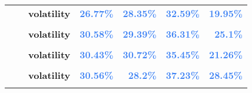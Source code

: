 \documentclass[
  authoryear,
  preprint,
  3p]{elsarticle}
\begin{document}
\begin{longtable}[t]{>{}l>{}l>{}l>{}r>{}r>{}r>{}r}
\textbf{} & \textbf{} & \textbf{volatility} & \textcolor[HTML]{4285f4}{\textbf{26.77\%}} & \textcolor[HTML]{4285f4}{\textbf{28.35\%}} & \textcolor[HTML]{4285f4}{\textbf{32.59\%}} & \textcolor[HTML]{4285f4}{\textbf{19.95\%}}\\
\textbf{\cellcolor{gray!10}{Lumber (XCME)}} & \textbf{\cellcolor{gray!10}{whole period}} & \textbf{\cellcolor{gray!10}{mean}} & \textcolor[HTML]{4285f4}{\textbf{\cellcolor{gray!10}{1.9\%}}} & \textcolor[HTML]{4285f4}{\textbf{\cellcolor{gray!10}{-3.58\%}}} & \textcolor[HTML]{4285f4}{\textbf{\cellcolor{gray!10}{11.74\%}}} & \textcolor[HTML]{4285f4}{\textbf{\cellcolor{gray!10}{5.06\%}}}\\
\textbf{} & \textbf{} & \textbf{volatility} & \textcolor[HTML]{4285f4}{\textbf{30.58\%}} & \textcolor[HTML]{4285f4}{\textbf{29.39\%}} & \textcolor[HTML]{4285f4}{\textbf{36.31\%}} & \textcolor[HTML]{4285f4}{\textbf{25.1\%}}\\
\textbf{\cellcolor{gray!10}{}} & \textbf{\cellcolor{gray!10}{backwardation}} & \textbf{\cellcolor{gray!10}{mean}} & \textcolor[HTML]{4285f4}{\textbf{\cellcolor{gray!10}{-8.48\%}}} & \textcolor[HTML]{4285f4}{\textbf{\cellcolor{gray!10}{-2.37\%}}} & \textcolor[HTML]{4285f4}{\textbf{\cellcolor{gray!10}{29.11\%}}} & \textcolor[HTML]{4285f4}{\textbf{\cellcolor{gray!10}{**26.99\%}}}\\
\addlinespace
\textbf{} & \textbf{} & \textbf{volatility} & \textcolor[HTML]{4285f4}{\textbf{30.43\%}} & \textcolor[HTML]{4285f4}{\textbf{30.72\%}} & \textcolor[HTML]{4285f4}{\textbf{35.45\%}} & \textcolor[HTML]{4285f4}{\textbf{21.26\%}}\\
\textbf{\cellcolor{gray!10}{}} & \textbf{\cellcolor{gray!10}{contango}} & \textbf{\cellcolor{gray!10}{mean}} & \textcolor[HTML]{4285f4}{\textbf{\cellcolor{gray!10}{11.68\%}}} & \textcolor[HTML]{4285f4}{\textbf{\cellcolor{gray!10}{-4.77\%}}} & \textcolor[HTML]{4285f4}{\textbf{\cellcolor{gray!10}{-5.04\%}}} & \textcolor[HTML]{4285f4}{\textbf{\cellcolor{gray!10}{-17.14\%}}}\\
\textbf{} & \textbf{} & \textbf{volatility} & \textcolor[HTML]{4285f4}{\textbf{30.56\%}} & \textcolor[HTML]{4285f4}{\textbf{28.2\%}} & \textcolor[HTML]{4285f4}{\textbf{37.23\%}} & \textcolor[HTML]{4285f4}{\textbf{28.45\%}}\\
\textbf{\cellcolor{gray!10}{Orange juice (IFUS)}} & \textbf{\cellcolor{gray!10}{whole period}} & \textbf{\cellcolor{gray!10}{mean}} & \textcolor[HTML]{4285f4}{\textbf{\cellcolor{gray!10}{1.67\%}}} & \textcolor[HTML]{4285f4}{\textbf{\cellcolor{gray!10}{13.87\%}}} & \textcolor[HTML]{4285f4}{\textbf{\cellcolor{gray!10}{14.4\%}}} & \textcolor[HTML]{4285f4}{\textbf{\cellcolor{gray!10}{3.8\%}}}\\

\end{longtable}
\end{document}
